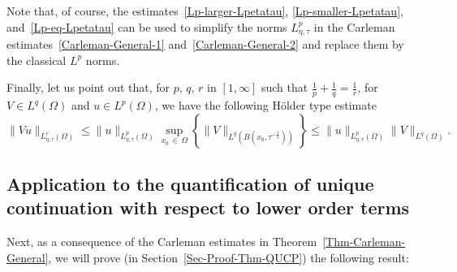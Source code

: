 \documentclass[AHL,Unicode,longabstracts]{cedram}
\renewcommand{\leq}{\leqslant}
\begin{document}
Note that, of course, the estimates~\eqref{Lp-larger-Lpetatau}, \eqref{Lp-smaller-Lpetatau}, and~\eqref{Lp-eq-Lpetatau} can be used to simplify the norms $L^p_{\eta, \tau}$ in the Carleman estimates~\eqref{Carleman-General-1} and~\eqref{Carleman-General-2} and replace them by the classical $L^p$ norms.

Finally, let us point out that, for $p,\, q, \, r$ in $[1, \infty]$ such that $\frac{1}{p} + \frac{1}{q} = \frac{1}{r}$, for $V \in L^q(\Omega)$ and $u \in L^p(\Omega)$, we have the following Hölder type estimate
\begin{equation}\label{Holder-in-Lp-tau-eta}
\| Vu \|_{L^r_{\eta, \tau}(\Omega)}
\leq \| u\|_{L^p_{\eta, \tau}(\Omega)} \sup_{x_0\,\in\,\Omega} \left\{ \| V\|_{L^q\left(B\left(x_0, \tau^{-\frac{1}{3}}\right)\right)} \right\}
\leq \| u\|_{L^p_{\eta, \tau}(\Omega)} \| V \|_{L^q(\Omega)}.
\end{equation}


\subsection*{Application to the quantification of unique continuation with respect to lower order terms}

 Next, as a consequence of the Carleman estimates in Theorem~\ref{Thm-Carleman-General}, we will prove (in Section~\ref{Sec-Proof-Thm-QUCP}) the following result:
\end{document}
